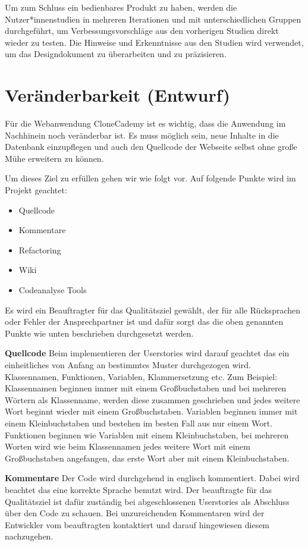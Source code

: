 \documentclass[accentcolor=tud0b,12pt,paper=a4]{tudreport}
\begin{document}
Um zum Schluss ein bedienbares Produkt zu haben, werden die Nutzer*innenstudien in mehreren Iterationen und mit unterschiedlichen Gruppen durchgeführt, um Verbessungsvorschläge aus den vorherigen Studien direkt wieder zu testen. Die Hinweise und Erkenntnisse aus den Studien wird verwendet, um das Designdokument zu überarbeiten und zu präzisieren.

\section{Veränderbarkeit (Entwurf)}
Für die Webanwendung CloneCademy ist es wichtig, dass die Anwendung im Nachhinein noch veränderbar ist. Es muss möglich sein, neue Inhalte in die Datenbank einzupflegen und auch den Quellcode der Webseite selbst ohne große Mühe erweitern zu können.

Um dieses Ziel zu erfüllen gehen wir wie folgt vor. Auf folgende Punkte wird im Projekt geachtet:
\begin{itemize}
	\item Quellcode
	\item Kommentare
	\item Refactoring
	\item Wiki
	\item Codeanalyse Tools
\end{itemize}

Es wird ein Beauftragter für das Qualitätsziel gewählt, der für alle Rücksprachen oder Fehler der Ansprechpartner ist und dafür sorgt das die oben genannten Punkte wie unten beschrieben durchgesetzt werden.

\textbf{Quellcode}
Beim implementieren der Userstories wird darauf geachtet das ein einheitliches von Anfang an bestimmtes Muster durchgezogen wird. Klassennamen, Funktionen, Variablen, Klammersetzung etc. Zum Beispiel:
Klassennamen beginnen immer mit einem Großbuchstaben und bei mehreren Wörtern als Klassenname, werden diese zusammen geschrieben und jedes weitere Wort beginnt wieder mit einem Großbuchstaben.
Variablen beginnen immer mit einem Kleinbuchstaben und bestehen im besten Fall aus nur einem Wort.
Funktionen beginnen wie Variablen mit einem Kleinbuchstaben, bei mehreren Worten wird wie beim Klassennamen jedes weitere Wort mit einem Großbuchstaben angefangen, das erste Wort aber mit einem Kleinbuchstaben.

\textbf{Kommentare}
Der Code wird durchgehend in englisch kommentiert. Dabei wird beachtet das eine korrekte Sprache benutzt wird. Der beauftragte für das Qualitätsziel ist dafür zuständig bei abgeschlossenen Userstories als Abschluss über den Code zu schauen. Bei unzureichenden Kommentaren wird der Entwickler vom beauftragten kontaktiert und darauf hingewiesen diesem nachzugehen.
\end{document}
